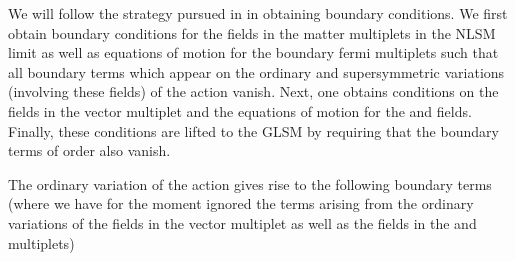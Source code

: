 \documentclass[a4paper,12pt]{article}
\begin{document}
We will follow the strategy pursued in \cite{lsmone} in obtaining
boundary conditions. We  first
obtain boundary conditions for the fields in the matter multiplets in
the NLSM limit as well as equations of motion for the boundary fermi
multiplets such that all boundary terms which appear on the ordinary and
supersymmetric variations (involving these fields) of the action vanish. 
Next, one obtains conditions on the fields in the vector
multiplet and the equations of motion for the \coordHE{} and \coordHE{} fields. 
Finally, these conditions are lifted to the GLSM by
requiring that the boundary terms of order \coordHE{} also vanish.


The ordinary variation of the action gives rise to the following boundary
terms (where we have for the moment ignored the terms arising from the
ordinary variations of the fields in the vector multiplet as well
as the fields in the \coordHE{} and \coordHE{} multiplets)
\end{document}
